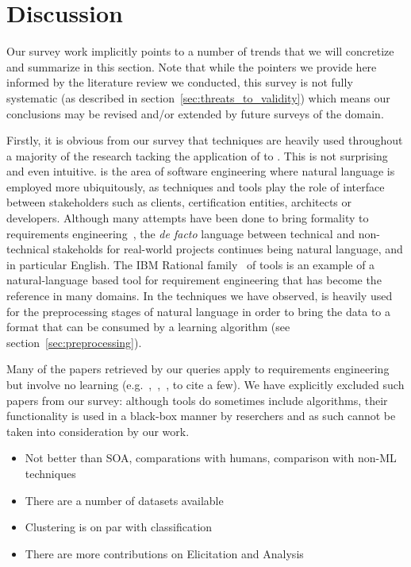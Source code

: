 \section{Discussion}

Our survey work implicitly points to a number of trends that we will
concretize and summarize in this section. Note that while the pointers we
provide here informed by the literature review we conducted, this survey is not
fully systematic (as described in section~\ref{sec:threats_to_validity}) which
means our conclusions may be revised and/or extended by future surveys of the
domain.

Firstly, it is obvious from our survey that \NLP techniques are heavily used
throughout a majority of the research tacking the application of \ML to
\RE. This is not surprising and even intuitive. \RE is the area of software
engineering where natural language is employed more ubiquitously, as \RE
techniques and tools play the role of interface between stakeholders such as
clients, certification entities, architects or developers. Although many
attempts have been done to bring formality to requirements
engineering~\cite{Teufl17,LucioRCA16}, the \emph{de facto} language between
technical and non-technical stakeholds for real-world projects continues being natural language, and in particular English.
The IBM Rational \DOORS family~\cite{doors} of tools is an example
of a natural-language based tool for requirement engineering that has become the
reference in many domains. In the techniques we have observed, \NLP is heavily
used for the preprocessing stages of natural language in order to bring the data to a format
that can be consumed by a learning algorithm (see
section~\ref{sec:preprocessing}).

Many of the papers retrieved by our queries apply \NLP to requirements
engineering but involve no learning (e.g.~\cite{Xiao:2012},~\cite{Deeptimahanti:2011},~\cite{ChengHeLiangLi:2010}, to
cite a few). We have explicitly excluded such papers from our survey: although
\NLP tools do sometimes include \ML algorithms, their functionality is used in a black-box
manner by \RE reserchers and as such cannot be taken into consideration by our
work.

\begin{itemize}
  \item Not better than SOA, comparations with humans, comparison with non-ML
  techniques
  \item There are a number of datasets available
  \item Clustering is on par with classification
  \item There are more contributions on Elicitation and Analysis
\end{itemize}



